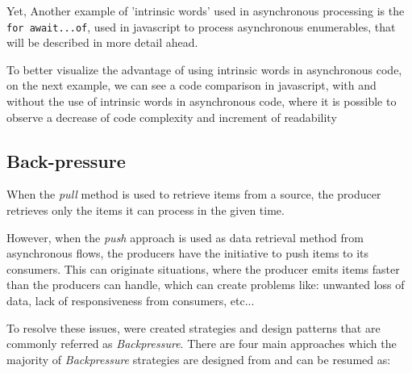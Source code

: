 	Yet, Another example of 'intrinsic words' used in asynchronous processing is the \texttt{for await...of}, used in javascript to process asynchronous enumerables, that will be described in more detail ahead. 
	
	To better visualize the advantage of using intrinsic words in asynchronous code, on the next example, we can see a code comparison in javascript, with and without the use of intrinsic words in asynchronous code, where it is possible to observe a decrease of code complexity and increment of readability 
	
	

	
	\clearpage

	\subsection{Back-pressure} 

	When the \textit{pull} method is used to retrieve items from a source, the producer retrieves only the items it can process in the given time. 
	
	However, when the \textit{push} approach is used as data retrieval method from asynchronous flows, the producers have the initiative to push items to its consumers. 
	This can originate situations, where the producer emits items faster than the producers can handle, which can create problems like: unwanted loss of data, lack of responsiveness from consumers, etc... 
	
	To resolve these issues, were created strategies and design patterns that are commonly referred as \textit{Backpressure}.
	There are four main approaches which the majority of \textit{Backpressure} strategies are designed from and can be resumed as: 
	
